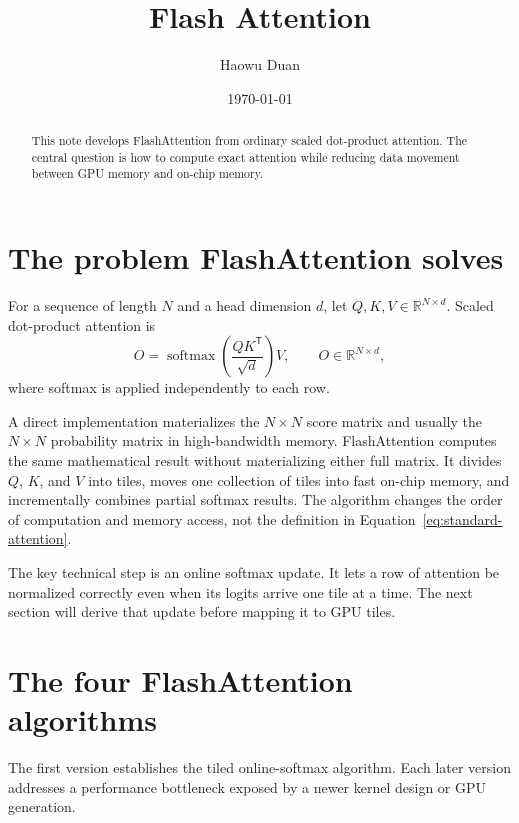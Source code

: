 \documentclass[11pt]{article}
\title{Flash Attention}
\author{Haowu Duan}
\date{\today}
\numberwithin{equation}{section}
\newcommand{\R}{\mathbb{R}}
\newcommand{\softmax}{\operatorname{softmax}}
\begin{document}
\maketitle

\begin{abstract}
This note develops FlashAttention from ordinary scaled dot-product
attention.  The central question is how to compute exact attention while reducing
data movement between GPU memory and on-chip memory.
\end{abstract}

\tableofcontents
\newpage

\section{The problem FlashAttention solves}

For a sequence of length $N$ and a head dimension $d$, let
$Q,K,V\in\R^{N\times d}$.  Scaled dot-product attention is
\begin{equation}
  O
  = \softmax\!\left(\frac{QK^{\mathsf T}}{\sqrt d}\right)V,
  \qquad O\in\R^{N\times d},
  \label{eq:standard-attention}
\end{equation}
where softmax is applied independently to each row.

A direct implementation materializes the $N\times N$ score matrix and usually the
$N\times N$ probability matrix in high-bandwidth memory.  FlashAttention computes
the same mathematical result without materializing either full matrix.  It divides
$Q$, $K$, and $V$ into tiles, moves one collection of tiles into fast on-chip
memory, and incrementally combines partial softmax results.  The algorithm changes
the order of computation and memory access, not the definition in
Equation~\eqref{eq:standard-attention}.

The key technical step is an online softmax update.  It lets a row of attention be
normalized correctly even when its logits arrive one tile at a time.  The next
section will derive that update before mapping it to GPU tiles.

\newpage
\section{The four FlashAttention algorithms}

The first version establishes the tiled online-softmax algorithm.  Each later
version addresses a performance bottleneck exposed by a newer kernel design or GPU
generation.
\end{document}
